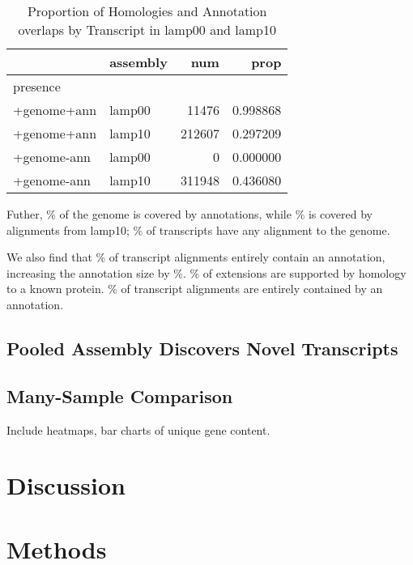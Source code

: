 \documentclass{article}
\begin{document}
\begin{table}[H]
\caption {Proportion of Homologies and Annotation overlaps by Transcript in lamp00 and lamp10}
\begin{center}

\begin{tabular}{llrr}
\toprule
{} & assembly &     num &      prop \\
\midrule
presence    &          &         &           \\
+genome+ann &   lamp00 &   11476 &  0.998868 \\
+genome+ann &   lamp10 &  212607 &  0.297209 \\
+genome-ann &   lamp00 &       0 &  0.000000 \\
+genome-ann &   lamp10 &  311948 &  0.436080 \\
\bottomrule
\end{tabular}



\end{center}
\end{table}



Futher, \% of the genome is covered by annotations, while \% is covered by alignments from lamp10; \% of transcripts have any alignment to the genome.

We also find that \% of transcript alignments entirely contain an annotation, increasing the annotation size by \%. \% of extensions are supported by homology to a known protein. \% of transcript alignments are entirely contained by an annotation.


\subsection*{Pooled Assembly Discovers Novel Transcripts}

\subsection*{Many-Sample Comparison}

Include heatmaps, bar charts of unique gene content.

\section*{Discussion}

\section*{Methods}
\end{document}

